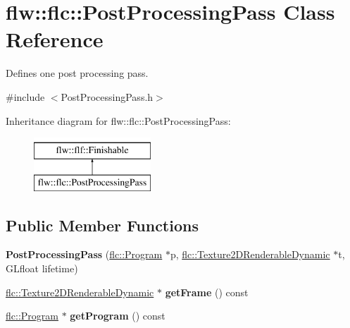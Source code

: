 \hypertarget{classflw_1_1flc_1_1PostProcessingPass}{}\section{flw\+:\+:flc\+:\+:Post\+Processing\+Pass Class Reference}
\label{classflw_1_1flc_1_1PostProcessingPass}


Defines one post processing pass.  




{\ttfamily \#include $<$Post\+Processing\+Pass.\+h$>$}

Inheritance diagram for flw\+:\+:flc\+:\+:Post\+Processing\+Pass\+:\begin{figure}[H]
\begin{center}
\leavevmode
\includegraphics[height=2.000000cm]{classflw_1_1flc_1_1PostProcessingPass}
\end{center}
\end{figure}
\subsection*{Public Member Functions}
\begin{DoxyCompactItemize}
\item 
{\bfseries Post\+Processing\+Pass} (\hyperlink{classflw_1_1flc_1_1Program}{flc\+::\+Program} $\ast$p, \hyperlink{classflw_1_1flc_1_1Texture2DRenderableDynamic}{flc\+::\+Texture2\+D\+Renderable\+Dynamic} $\ast$t, G\+Lfloat lifetime)\hypertarget{classflw_1_1flc_1_1PostProcessingPass_ab2d9a6822f4ecfcc711efd14007338ac}{}\label{classflw_1_1flc_1_1PostProcessingPass_ab2d9a6822f4ecfcc711efd14007338ac}

\item 
\hyperlink{classflw_1_1flc_1_1Texture2DRenderableDynamic}{flc\+::\+Texture2\+D\+Renderable\+Dynamic} $\ast$ {\bfseries get\+Frame} () const \hypertarget{classflw_1_1flc_1_1PostProcessingPass_a05db81aac6bad2393f0ccf980f60809b}{}\label{classflw_1_1flc_1_1PostProcessingPass_a05db81aac6bad2393f0ccf980f60809b}

\item 
\hyperlink{classflw_1_1flc_1_1Program}{flc\+::\+Program} $\ast$ {\bfseries get\+Program} () const \hypertarget{classflw_1_1flc_1_1PostProcessingPass_a028e13d7aa16b3a42b8d5a7b40bdbe56}{}\label{classflw_1_1flc_1_1PostProcessingPass_a028e13d7aa16b3a42b8d5a7b40bdbe56}

\end{DoxyCompactItemize}

